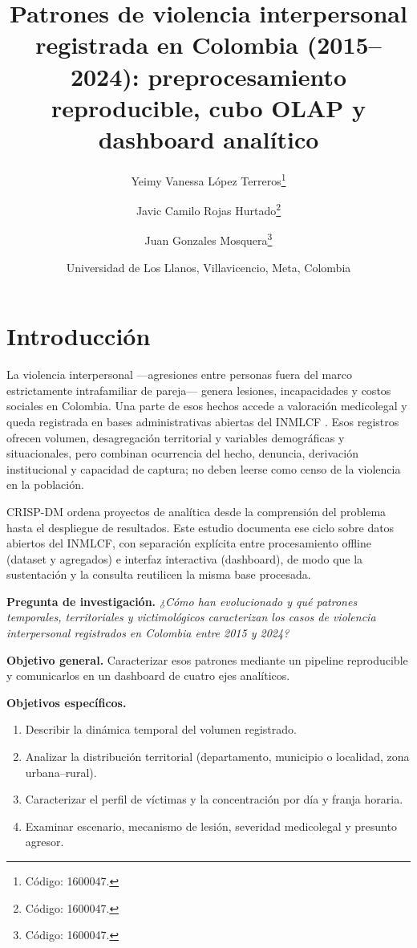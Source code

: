\documentclass[
	a4paper,
	10pt,
	unnumberedsections,
	twoside,
]{LTJournalArticle}
\title{Patrones de violencia interpersonal registrada en Colombia (2015--2024): preprocesamiento reproducible, cubo OLAP y dashboard anal\'itico}
\author{%
	Yeimy Vanessa L\'opez Terreros\thanks{C\'odigo: 1600047.} \and
	Javic Camilo Rojas Hurtado\thanks{C\'odigo: 1600047.} \and
	Juan Gonzales Mosquera\thanks{C\'odigo: 1600047.}
}
\date{\footnotesize Universidad de Los Llanos, Villavicencio, Meta, Colombia}
\begin{document}
\maketitle

\section{Introducci\'on}

La violencia interpersonal ---agresiones entre personas fuera del marco estrictamente intrafamiliar de pareja--- genera lesiones, incapacidades y costos sociales en Colombia.
Una parte de esos hechos accede a valoraci\'on medicolegal y queda registrada en bases administrativas abiertas del INMLCF \cite{medicinalegal2024}.
Esos registros ofrecen volumen, desagregaci\'on territorial y variables demogr\'aficas y situacionales, pero combinan ocurrencia del hecho, denuncia, derivaci\'on institucional y capacidad de captura; no deben leerse como censo de la violencia en la poblaci\'on.

CRISP-DM \cite{wirth2000crisp} ordena proyectos de anal\'itica desde la comprensi\'on del problema hasta el despliegue de resultados.
Este estudio documenta ese ciclo sobre datos abiertos del INMLCF, con separaci\'on expl\'icita entre procesamiento offline (dataset y agregados) e interfaz interactiva (dashboard), de modo que la sustentaci\'on y la consulta reutilicen la misma base procesada.

\textbf{Pregunta de investigaci\'on.}
\emph{¿C\'omo han evolucionado y qu\'e patrones temporales, territoriales y victimol\'ogicos caracterizan los casos de violencia interpersonal registrados en Colombia entre 2015 y 2024?}

\textbf{Objetivo general.}
Caracterizar esos patrones mediante un pipeline reproducible y comunicarlos en un dashboard de cuatro ejes anal\'iticos.

\textbf{Objetivos espec\'ificos.}
\begin{enumerate}
	\item Describir la din\'amica temporal del volumen registrado.
	\item Analizar la distribuci\'on territorial (departamento, municipio o localidad, zona urbana--rural).
	\item Caracterizar el perfil de v\'ictimas y la concentraci\'on por d\'ia y franja horaria.
	\item Examinar escenario, mecanismo de lesi\'on, severidad medicolegal y presunto agresor.
\end{enumerate}
\end{document}
